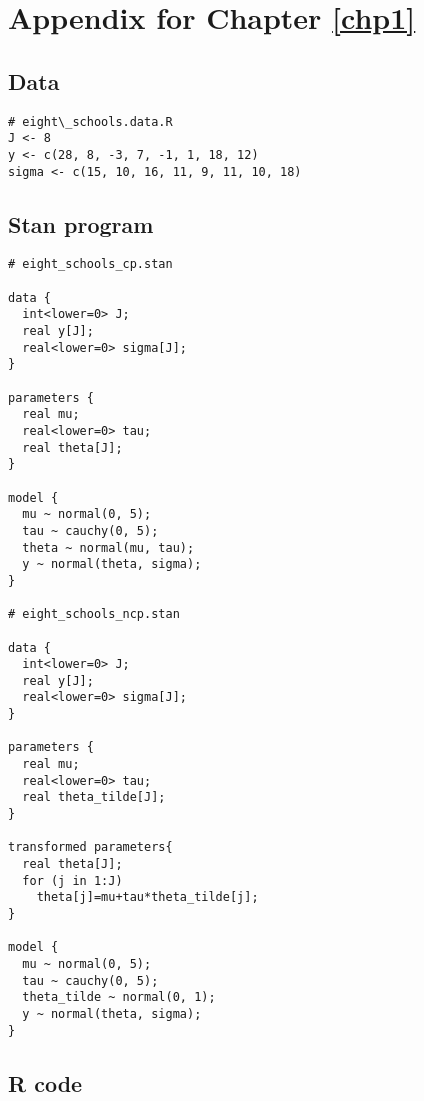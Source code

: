 \chapter{Appendix for Chapter \ref{chp1}} \label{app:a}
\section{Data}

\begin{verbatim}
# eight\_schools.data.R
J <- 8
y <- c(28, 8, -3, 7, -1, 1, 18, 12)
sigma <- c(15, 10, 16, 11, 9, 11, 10, 18)
\end{verbatim}

\section{Stan program}
\begin{verbatim}
# eight_schools_cp.stan

data {
  int<lower=0> J;
  real y[J];
  real<lower=0> sigma[J];
}

parameters {
  real mu;
  real<lower=0> tau;
  real theta[J];
}

model {
  mu ~ normal(0, 5);
  tau ~ cauchy(0, 5);
  theta ~ normal(mu, tau);
  y ~ normal(theta, sigma);
}

# eight_schools_ncp.stan

data {
  int<lower=0> J;
  real y[J];
  real<lower=0> sigma[J];
}

parameters {
  real mu;
  real<lower=0> tau;
  real theta_tilde[J];
}

transformed parameters{
  real theta[J];
  for (j in 1:J)
    theta[j]=mu+tau*theta_tilde[j];
}

model {
  mu ~ normal(0, 5);
  tau ~ cauchy(0, 5);
  theta_tilde ~ normal(0, 1);
  y ~ normal(theta, sigma);
}

\end{verbatim}

\section{R code}

